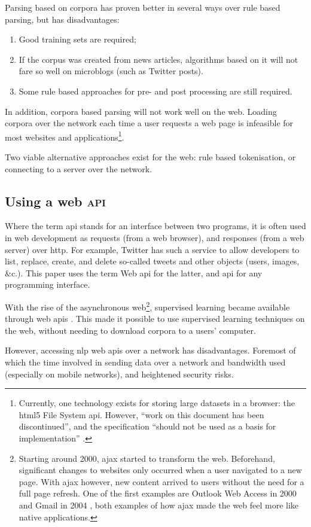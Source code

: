 Parsing based on corpora has proven better in several ways over rule based
  parsing, but has disadvantages:

\begin{enumerate}
\item Good training sets are required;
\item If the corpus was created from news articles, algorithms based on it
  will not fare so well on microblogs (such as Twitter posts).
\item Some rule based approaches for pre- and post processing are still
  required.
\end{enumerate}

\noindent In addition, corpora based parsing will not work well on the web.
Loading corpora over the network each time a user requests a web page is
  infeasible for most websites and applications\footnote{Currently,
    one technology exists for storing large datasets in a browser: the
    \acrshort{html5} File System \acrshort{api}. However, ``work on this
    document has been discontinued'', and the specification ``should not be
    used as a basis for implementation'' \autocite{urhane-file-api}.}.

Two viable alternative approaches exist for the web: rule based tokenisation,
  or connecting to a server over the network.

\subsection{Using a web \textsc{api}}\label{using-a-web}

Where the term \gls{api} stands for an interface between two programs,
  it is often used in web development as requests (from a web browser),
  and responses (from a web server) over \gls{http}.
For example, Twitter has such a service to allow developers to list,
  replace, create, and delete so-called tweets and other objects (users,
  images, \&c.).
This paper uses the term Web \gls{api} for the latter, and \gls{api} for
any programming interface.

With the rise of the asynchronous web\footnote{Starting around 2000,
    \gls{ajax} started to transform the web.
  Beforehand, significant changes to websites only occurred when a user
    navigated to a new page. 
  With \gls{ajax} however, new content arrived to users without the need
    for a full page refresh. One of the first examples are Outlook Web
    Access in 2000 \autocite{technet-outlook-web-access} and Gmail in 2004
    \autocite{gmailblog-gmail-ajax}, both examples of how \gls{ajax} made
    the web feel more like native applications.},
  supervised learning became available through web \glspl{api}
  \autocites{textteaser-web-api}{wordnet-web-api}{textrazor-web-api}.
This made it possible to use supervised learning techniques on the web,
  without needing to download corpora to a users' computer.

However, accessing \gls{nlp} web \glspl{api} over a network has
  disadvantages.
Foremost of which the time involved in sending data over a network and
  bandwidth used (especially on mobile networks), and heightened security
  risks.
